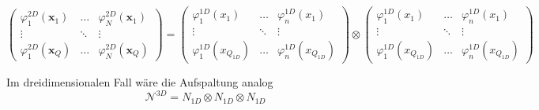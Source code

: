 \begin{equation*}
\begin{pmatrix}
\varphi^{2D}_1(\bm{x}_1) & \hdots & \varphi^{2D}_N(\bm{x}_1) \\
\vdots & \ddots & \vdots \\
\varphi^{2D}_1(\bm{x}_Q) & \hdots & \varphi^{2D}_N(\bm{x}_Q)
\end{pmatrix}
=
\begin{pmatrix}
\varphi^{1D}_1(x_1) & \hdots & \varphi^{1D}_n(x_1) \\
\vdots & \ddots & \vdots \\
\varphi^{1D}_1(x_{Q_{1D}}) & \hdots & \varphi^{1D}_n(x_{Q_{1D}})
\end{pmatrix}
\otimes
\begin{pmatrix}
\varphi^{1D}_1(x_1) & \hdots & \varphi^{1D}_n(x_1) \\
\vdots & \ddots & \vdots \\
\varphi^{1D}_1(x_{Q_{1D}}) & \hdots & \varphi^{1D}_n(x_{Q_{1D}})
\end{pmatrix}
\end{equation*}

Im dreidimensionalen Fall wäre die Aufspaltung analog
\begin{equation}
\mathcal{N}^{3D} = N_{1D} \otimes N_{1D} \otimes N_{1D}
\end{equation}

\newpage



